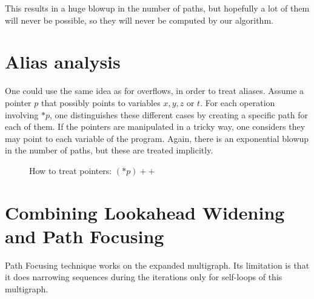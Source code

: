 \documentclass[a4paper,english,titlepage,11pt]{report}
\begin{document}
This results in a huge blowup in the number of paths, but hopefully a lot of
them will never be possible, so they will never be computed by our algorithm.

	\section{Alias analysis}

One could use the same idea as for overflows, in order to treat aliases.
Assume a pointer $p$ that possibly points to variables $x,y,z$ or $t$. For each
operation involving $*p$, one distinguishes these different cases by
creating a specific path for each of them. 
If the pointers are manipulated in a tricky way, one considers they may
point to each variable of the program. Again, there is an exponential blowup in
the number of paths, but these are treated implicitly.

\begin{figure}[!h]
\centering
{}
\caption{How to treat pointers: $(*p)++$}
\label{pointers}
\end{figure}

	\section{Combining Lookahead Widening and Path Focusing}
	\label{combining}
	Path Focusing technique works on the expanded multigraph.
	Its limitation is that it does narrowing
	sequences during the iterations only for self-loops of this multigraph.
	
\end{document}
